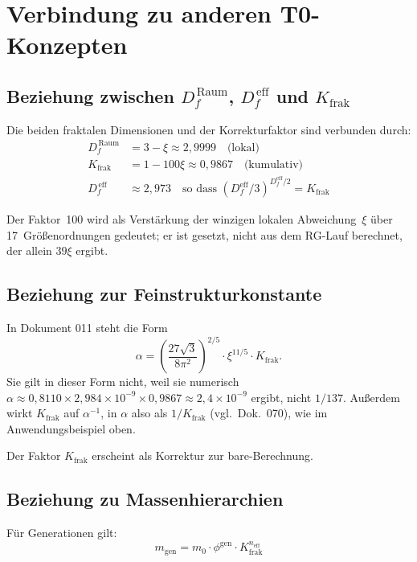 	\section{Verbindung zu anderen T0-Konzepten}
	
	\subsection{Beziehung zwischen $D_f^{\,\text{Raum}}$, $D_f^{\,\text{eff}}$ und $K_{\text{frak}}$}
	
	Die beiden fraktalen Dimensionen und der Korrekturfaktor sind verbunden durch:
	\begin{align}
		D_f^{\,\text{Raum}} &= 3 - \xi \approx 2{,}9999 \quad \text{(lokal)} \\
		K_{\text{frak}} &= 1 - 100\xi \approx 0{,}9867 \quad \text{(kumulativ)} \\
		D_f^{\,\text{eff}} &\approx 2{,}973 \quad \text{so dass } (D_f^{\text{eff}}/3)^{D_f^{\text{eff}}/2} = K_{\text{frak}}
	\end{align}
	
	Der Faktor~100 wird als Verstärkung der winzigen lokalen Abweichung~$\xi$ über 17~Größenordnungen gedeutet; er ist gesetzt, nicht aus dem RG-Lauf berechnet, der allein $39\xi$ ergibt.

	
	\subsection{Beziehung zur Feinstrukturkonstante}
	
	In Dokument 011 steht die Form
	\begin{equation}
		\alpha = \left(\frac{27\sqrt{3}}{8\pi^2}\right)^{2/5} \cdot \xi^{11/5} \cdot K_{\text{frak}}.
	\end{equation}
	Sie gilt in dieser Form nicht, weil sie numerisch $\alpha \approx 0{,}8110 \times 2{,}984\times10^{-9} \times 0{,}9867 \approx 2{,}4\times10^{-9}$ ergibt, nicht $1/137$. Außerdem wirkt $K_{\text{frak}}$ auf $\alpha^{-1}$, in $\alpha$ also als $1/K_{\text{frak}}$ (vgl.\ Dok.~070), wie im Anwendungsbeispiel oben.
	
	Der Faktor $K_{\text{frak}}$ erscheint als Korrektur zur bare-Berechnung.
	
	\subsection{Beziehung zu Massenhierarchien}
	
	Für Generationen gilt:
	\begin{equation}
		m_{\text{gen}} = m_0 \cdot \phi^{\text{gen}} \cdot K_{\text{frak}}^{n_{\text{eff}}}
	\end{equation}
	
